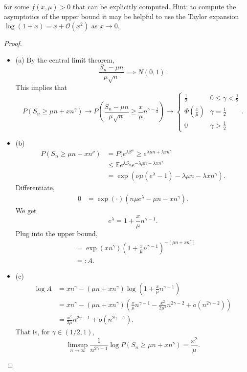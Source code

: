 for some $f(x, \mu)>0$ that can be explicitly computed.
Hint: to compute the asymptotics of the upper bound it may be helpful to use the Taylor expansion $\log (1+x)=x+\mathcal{O}\left(x^2\right)$ as $x \rightarrow 0$.

\begin{proof}
	\begin{itemize}
		\item (a) 
			By the central limit theorem,
			\[
				\frac{S_n - \mu n}{\mu \sqrt{n} } \implies N(0,1)
			.\] 
			This implies that
			\[
				P(S_n \ge \mu n + x n^\gamma) \to P\left( \frac{S_n - \mu n}{\mu \sqrt{n} } \ge \frac{x}{\mu}n^{\gamma - \frac{1}{2}} \right)  \to 
				\begin{cases}
					\frac{1}{2} & 0\le \gamma < \frac{1}{2} \\
					\Phi(\frac{x}{\mu}) & \gamma = \frac{1}{2} \\
					0 & \gamma > \frac{1}{2}
				\end{cases}
			.\] 
		\item (b)
			\begin{align*}
				P(S_n \ge  \mu n + x n^\nu)
				&= P(e^{\lambda S^n} \ge e^{\lambda \mu n + \lambda x n^\gamma} \\
				&\le \mathbb{E} e^{\lambda S_n} e^{- \lambda \mu n - \lambda x n^\gamma}  \\
				&= \exp \left( \nu \mu \left( e^\lambda - 1 \right) - \lambda \mu n - \lambda x n^\gamma \right) 
			.\end{align*}
			Differentiate,
			\begin{align*}
				0 &= \exp \left( \cdot\right) \left( n \mu e^\lambda - \mu n - x n^\gamma \right) 
			.\end{align*}
			We get
			\[
				e^\lambda = 1 + \frac{x}{\mu} n^{\gamma - 1}
			.\] 
			Plug into the upper bound,
			\begin{align*}
				&= \exp(x n^\gamma) \left( 1 + \frac{x}{\mu} n^{\gamma - 1} \right) ^{- (\mu n + x n^\gamma)} \\
				&=: A 
			.\end{align*}

		\item (c)
			\begin{align*}
				\log A &= x n^\gamma - (\mu n + x n^\gamma) \log \left( 1 + \frac{x}{\mu} n^{\gamma - 1} \right) \\
				&= x n^\gamma - (\mu n + x n^\gamma) \left(\frac{x}{\mu} n^{\gamma - 1} - \frac{x^2}{2\mu^2} n^{2 \gamma - 2}  + o(n^{2 \gamma - 2})\right) \\
				&= \frac{x^2}{2\mu}n^{2 \gamma - 1} + o(n^{2 \gamma - 1}) 
			.\end{align*}
			That is, for $\gamma \in (1/2, 1)$,
			\[
				\limsup_{n \to \infty } \frac{1}{n^{2\gamma - 1}} \log P\left( S_n \ge \mu n + x n^\gamma \right) = \frac{x^2}{\mu}
			.\] 

	\end{itemize}
\end{proof}

